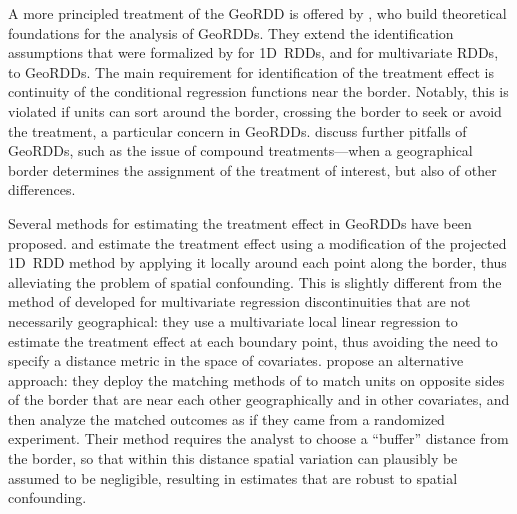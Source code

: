 A more principled treatment of the GeoRDD is offered by \cite{keele_titiunik_2015}, who build theoretical foundations for the analysis of GeoRDDs.
They extend the identification assumptions that were formalized by \cite{hahn2001identification} for 1D~RDDs, and \cite{imbens2011regression} for multivariate RDDs, to GeoRDDs.
The main requirement for identification of the treatment effect is continuity of the conditional regression functions near the border.
Notably, this is violated if units can sort around the border, crossing the border to seek or avoid the treatment, a particular concern in GeoRDDs.
\cite{keele_titiunik_2015} discuss further pitfalls of GeoRDDs, such as the issue of compound treatments---when a geographical border determines the assignment of the treatment of interest, but also of other differences.

Several methods for estimating the treatment effect in GeoRDDs have been proposed.
\cite{keele_titiunik_2015} and \cite{keeleoverview} estimate the treatment effect using a modification of the projected 1D~RDD method by applying it locally around each point along the border, thus alleviating the problem of spatial confounding.
This is slightly different from the method of \cite{imbens2011regression} developed for multivariate regression discontinuities that are not necessarily geographical: they use a multivariate local linear regression to estimate the treatment effect at each boundary point, thus avoiding the need to specify a distance metric in the space of covariates.
\cite{keele2015enhancing} propose an alternative approach: they deploy the matching methods of \cite{zubizarreta2012using} to match units on opposite sides of the border that are near each other geographically and in other covariates, and then analyze the matched outcomes as if they came from a randomized experiment.
Their method requires the analyst to choose a ``buffer'' distance from the border, so that within this distance spatial variation can plausibly be assumed to be negligible, resulting in estimates that are robust to spatial confounding.

\label{sec:framework}

